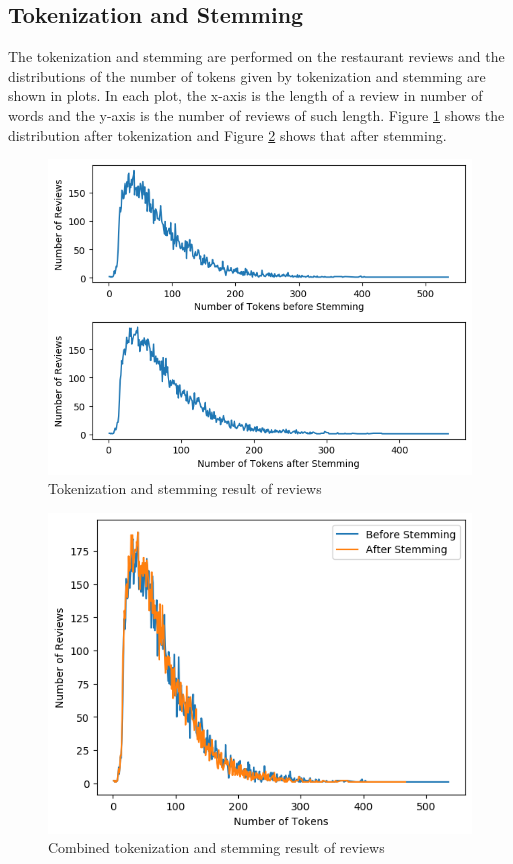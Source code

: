 \documentclass[sigconf]{acmart}
\begin{document}
\subsection{Tokenization and Stemming}
The tokenization and stemming are performed on the restaurant reviews and the distributions of the number of tokens given by tokenization and stemming are shown in plots. In each plot, the x-axis is the length of a review in number of words and the y-axis is the number of reviews of such length. Figure \ref{fig:token_stem_separate} shows the distribution after tokenization and Figure \ref{fig:token_stem_combined} shows that after stemming.

\begin{figure}[ht]
  \centering
  \includegraphics[width=\linewidth]{token_stem_separate.png}
  \caption{Tokenization and stemming result of reviews}
  \label{fig:token_stem_separate}
\end{figure}

\begin{figure}[ht]
  \centering
  \includegraphics[width=\linewidth]{token_stem_combined.png}
  \caption{Combined tokenization and stemming result of reviews}
  \label{fig:token_stem_combined}
\end{figure}
\end{document}
